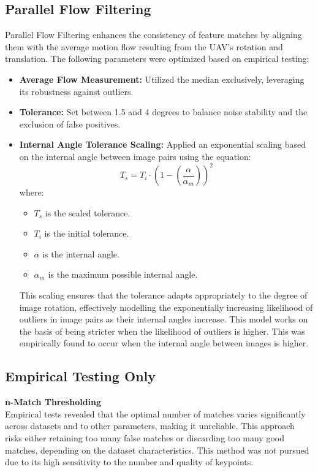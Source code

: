 \subsection{Parallel Flow Filtering}

Parallel Flow Filtering enhances the consistency of feature matches by aligning them with the average motion flow resulting from the UAV's rotation and translation. The following parameters were optimized based on empirical testing:

\begin{itemize}
    \item \textbf{Average Flow Measurement:} Utilized the median exclusively, leveraging its robustness against outliers.
    \item \textbf{Tolerance:} Set between 1.5 and 4 degrees to balance noise stability and the exclusion of false positives.
    \item \textbf{Internal Angle Tolerance Scaling:} Applied an exponential scaling based on the internal angle between image pairs using the equation:
    \begin{equation}
        T_s = T_i \cdot \left(1 - \left(\frac{\alpha}{\alpha_m}\right)\right)^2
    \end{equation}
    where:
    \begin{itemize}
        \item $T_s$ is the scaled tolerance.
        \item $T_i$ is the initial tolerance.
        \item $\alpha$ is the internal angle.
        \item $\alpha_m$ is the maximum possible internal angle.
    \end{itemize}
    This scaling ensures that the tolerance adapts appropriately to the degree of image rotation, effectively modelling the exponentially increasing likelihood of outliers in image pairs as their internal angles increase. This model works on the basis of being stricter when the likelihood of outliers is higher. This was empirically found to occur when the internal angle between images is higher. 
\end{itemize}

\subsection{\textbf{Empirical Testing Only}}

\textbf{n-Match Thresholding} \\
Empirical tests revealed that the optimal number of matches varies significantly across datasets and to other parameters, making it unreliable. This approach risks either retaining too many false matches or discarding too many good matches, depending on the dataset characteristics. This method was not pursued due to its high sensitivity to the number and quality of keypoints. 

